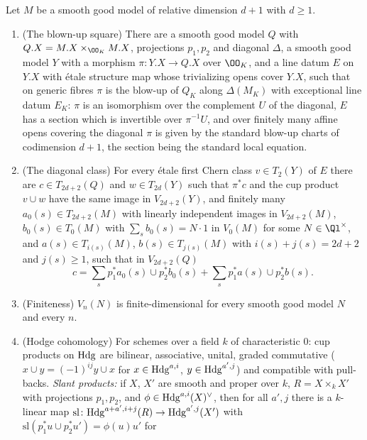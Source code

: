 \begin{lemma}\label{pf:steps1:diaginputs}
Let $M$ be a smooth good model of relative dimension $d+1$ with $d\ge1$.
\begin{enumerate}[label=\textup{(\roman*)},nosep]
\item \textup{(The blown-up square)} There are a smooth good model $Q$ with $Q.X=M.X\times_{\OO_K}M.X$, projections $p_1,p_2$ and
  diagonal $\Delta$, a smooth good model $Y$ with a morphism $\pi\colon Y.X\to Q.X$ over $\OO_K$, and a line datum $E$ on $Y.X$
  with \'etale structure map whose trivializing opens cover $Y.X$, such that on generic fibres $\pi$ is the blow-up of $Q_K$
  along $\Delta(M_K)$ with exceptional line datum $E_K$: $\pi$ is an isomorphism over the complement $U$ of the diagonal, $E$
  has a section which is invertible over $\pi^{-1}U$, and over finitely many affine opens covering the diagonal $\pi$ is given by
  the standard blow-up charts of codimension $d+1$, the section being the standard local equation.
\item \textup{(The diagonal class)} For every \'etale first Chern class $v\in T_2(Y)$ of $E$ there are $c\in T_{2d+2}(Q)$ and
  $w\in T_{2d}(Y)$ such that $\pi^*c$ and the cup product $v\cup w$ have the same image in $V_{2d+2}(Y)$, and finitely many
  $a_0(s)\in T_{2d+2}(M)$ with linearly independent images in $V_{2d+2}(M)$, $b_0(s)\in T_0(M)$ with $\sum_sb_0(s)=N\cdot1$
  in $V_0(M)$ for some $N\in\Ql^\times$, and $a(s)\in T_{i(s)}(M)$, $b(s)\in T_{j(s)}(M)$ with $i(s)+j(s)=2d+2$ and
  $j(s)\ge1$, such that in $V_{2d+2}(Q)$
  \begin{equation}\label{pf:steps1:eq:diagdec}
   c=\sum_sp_1^*a_0(s)\cup p_2^*b_0(s)+\sum_sp_1^*a(s)\cup p_2^*b(s).
  \end{equation}
\item \textup{(Finiteness)} $V_n(N)$ is finite-dimensional for every smooth good model $N$ and every $n$.
\item \textup{(Hodge cohomology)} For schemes over a field $k$ of characteristic $0$: cup products on $\mathrm{Hdg}$ are bilinear,
  associative, unital, graded commutative ($x\cup y=(-1)^{ij}y\cup x$ for $x\in\mathrm{Hdg}^{a,i}$, $y\in\mathrm{Hdg}^{a',j}$) and
  compatible with pull-backs. \emph{Slant products:} if $X$, $X'$ are smooth and proper over $k$, $R=X\times_kX'$ with projections
  $p_1,p_2$, and $\phi\in\mathrm{Hdg}^{a,i}(X)^\vee$, then for all $a',j$ there is a $k$-linear map
  $\mathrm{sl}\colon\mathrm{Hdg}^{a+a',i+j}(R)\to\mathrm{Hdg}^{a',j}(X')$ with $\mathrm{sl}(p_1^*u\cup p_2^*u')=\phi(u)u'$ for

\end{enumerate}
\end{lemma}
